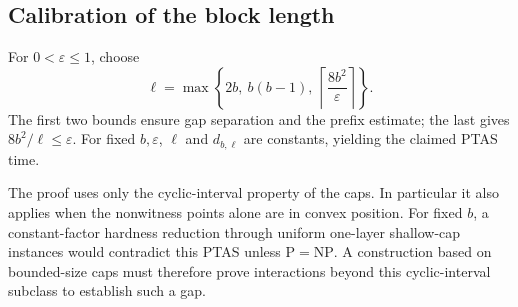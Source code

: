 \subsection{Calibration of the block length}
\label{sec:uniform-cap-calibration}

\begin{parameterchoice}
For $0<\varepsilon\le1$, choose
\[
 \ell=\max\left\{2b,\ b(b-1),\
                 \left\lceil\frac{8b^2}{\varepsilon}\right\rceil\right\}.
\]
The first two bounds ensure gap separation and the prefix estimate;
the last gives $8b^2/\ell\le\varepsilon$. For fixed $b,\varepsilon$,
$\ell$ and $d_{b,\ell}$ are constants, yielding the claimed PTAS time.
\end{parameterchoice}


The proof uses only the cyclic-interval property of the caps. In
particular it also applies when the nonwitness points alone are in
convex position. For fixed $b$, a constant-factor hardness reduction
through uniform one-layer shallow-cap instances would contradict
this PTAS unless $\mathrm P=\mathrm{NP}$. A construction based on
bounded-size caps must therefore prove interactions beyond this
cyclic-interval subclass to establish such a gap.
